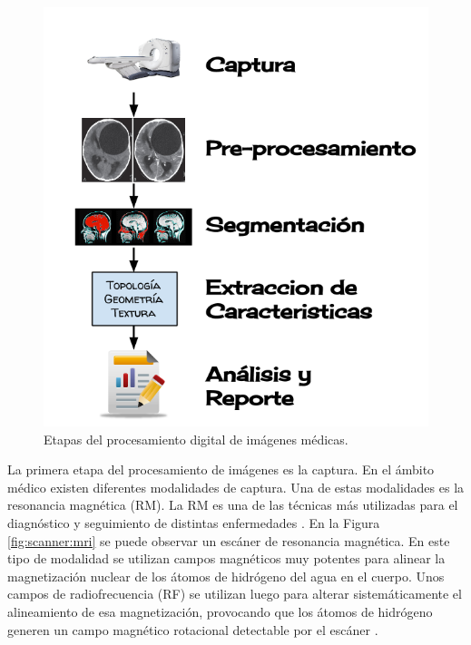 \begin{figure}[H]
\centering
\includegraphics[scale=0.3]{images/procesamiento.png}
\caption{Etapas del procesamiento digital de imágenes médicas.}
\label{fig:etapas_del_procesamiento}
\end{figure}

La primera etapa del procesamiento de imágenes es la captura. En el ámbito médico existen diferentes modalidades de captura. Una de estas modalidades es la resonancia magnética (RM). La RM es una de las técnicas más utilizadas para el diagnóstico y seguimiento de distintas enfermedades \citep{prince2006medical}. En la Figura \ref{fig:scanner:mri} se puede observar un escáner de resonancia magnética.  En este tipo de modalidad se utilizan campos magnéticos muy potentes para alinear la magnetización nuclear de los átomos  de hidrógeno del agua en el cuerpo. Unos campos de radiofrecuencia (RF) se utilizan luego para alterar sistemáticamente el alineamiento de esa magnetización, provocando que los átomos de hidrógeno generen un campo magnético rotacional detectable por el escáner \citep{novelline2004squire}.

